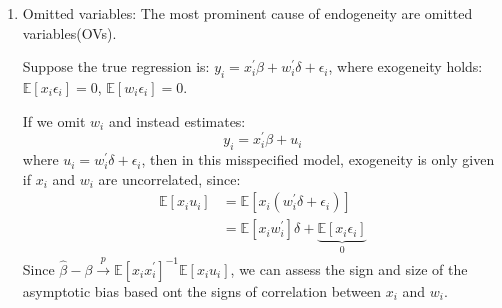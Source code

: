 \begin{enumerate}
    \item Omitted variables: The most prominent cause of endogeneity are omitted variables(OVs).

        Suppose the true regression is: $y_i = x_i^{\prime} \beta + w_i^{\prime} \delta +\epsilon_i$, 
        where exogeneity holds: $\mathbb{E}[x_i \epsilon_i] = 0$, $\mathbb{E}[w_i \epsilon_i] = 0$.
 
        If we omit $w_i$ and instead estimates:
        \[y_i = x_i^{\prime} \beta + u_i\]
        where $u_i = w_i^{\prime} \delta + \epsilon_i$,
        then in this misspecified model, exogeneity is only given if $x_i$ and $w_i$ are uncorrelated, since:
        \begin{align*}
            \mathbb{E}[x_i u_i] &= \mathbb{E}[x_i(w_i^{\prime} \delta + \epsilon_i)] \\
            &= \mathbb{E}[x_i w_i^{\prime}]\delta + \underset{0}{\underbrace{\mathbb{E}[x_i \epsilon_i]}}
        \end{align*}
        Since $\hat{\beta} - \beta \overset{p}{\rightarrow} \mathbb{E}[x_i x_i^{\prime}]^{-1} \mathbb{E}[x_i u_i]$,
        we can assess the sign and size of the asymptotic bias based ont the signs of correlation between $x_i$ and $w_i$.
\end{enumerate}

